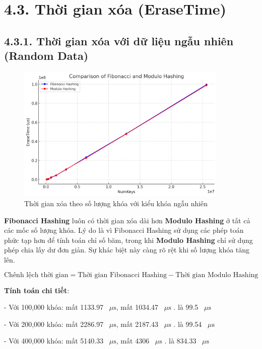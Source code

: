 \documentclass[12pt,a4paper]{report}
\begin{document}
\section*{4.3. Thời gian xóa (EraseTime)}
\subsection*{4.3.1. Thời gian xóa với dữ liệu ngẫu nhiên (Random Data)}
\begin{figure}[!ht]
    \centering
    \includegraphics[width=0.9\textwidth]{del_ran.png}
    \caption{Thời gian xóa theo số lượng khóa với kiểu khóa ngẫu nhiên}
    \label{fig:del_ran}
\end{figure}
\noindent \indent \textbf{Fibonacci Hashing} luôn có thời gian xóa dài hơn \textbf{Modulo Hashing} ở tất cả các mốc số lượng khóa. Lý do là vì Fibonacci Hashing sử dụng các phép toán phức tạp hơn để tính toán chỉ số băm, trong khi \textbf{Modulo Hashing} chỉ sử dụng phép chia lấy dư đơn giản. Sự khác biệt này càng rõ rệt khi số lượng khóa tăng lên.

\[
\text{Chênh lệch thời gian} = \text{Thời gian Fibonacci Hashing} - \text{Thời gian Modulo Hashing}
\]

\textbf{Tính toán chi tiết}:


  - Với 100,000 khóa:
   mất 1133.97 \, $\mu\text{s}$,  mất 1034.47 \, $\mu\text{s}$  . là 99.5 \, $\mu\text{s}$
  
  - Với 200,000 khóa:
   mất 2286.97 \, $\mu\text{s}$,  mất 2187.43 \, $\mu\text{s}$  . là 99.54 \, $\mu\text{s}$

  - Với 400,000 khóa:
   mất 5140.33 \, $\mu\text{s}$,  mất 4306 \, $\mu\text{s}$ . là 834.33 \, $\mu\text{s}$
\end{document}
